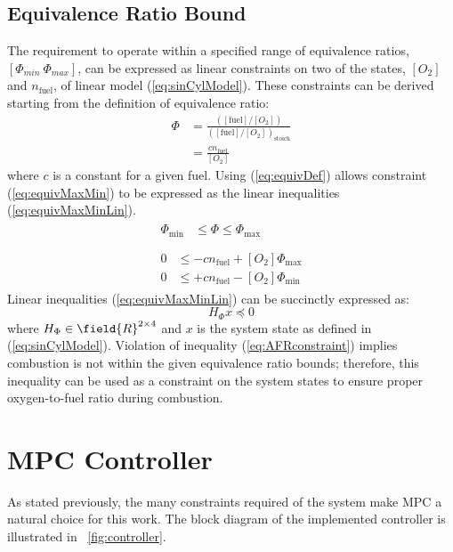 \subsection{Equivalence Ratio Bound}
\label{sec:stateConstraints}
The requirement to operate within a specified range of equivalence ratios, $[\Phi_{min}~\Phi_{max}]$, can be expressed as linear constraints on two of the states, $[O_2]$ and $n_{\mathrm{fuel}}$, of linear model (\ref{eq:sinCylModel}). These constraints can be derived starting from the definition of equivalence ratio:
\begin{equation}
\begin{aligned}
\Phi &= \frac{([\mathrm{fuel}]/[O_2])}{([\mathrm{fuel}]/[O_2])_{\mathrm{stoich}}}\\
&= \frac{cn_{\mathrm{fuel}}}{[O_2]} \label{eq:equivDef}
\end{aligned}
\end{equation}
where $c$ is a constant for a given fuel. Using (\ref{eq:equivDef}) allows constraint (\ref{eq:equivMaxMin}) to be expressed as the linear inequalities (\ref{eq:equivMaxMinLin}).
\begin{gather}
\begin{aligned}
\Phi_{\mathrm{min}} &\leq \Phi \leq \Phi_{\mathrm{max}} \label{eq:equivMaxMin}\\
\end{aligned}\\
\begin{aligned}
0 &\leq -cn_{\mathrm{fuel}} + [O_2] \Phi_{\mathrm{max}} \label{eq:equivMaxMinLin}\\
0 &\leq +cn_{\mathrm{fuel}} - [O_2] \Phi_{\mathrm{min}}
\end{aligned}
\end{gather}
Linear inequalities (\ref{eq:equivMaxMinLin}) can be succinctly expressed as:
\begin{equation}
H_{\Phi}x \preceq 0 \label{eq:AFRconstraint}
\end{equation}
where $H_{\Phi}\in\field{R}^{2\times4}$ and $x$ is the system state as defined in (\ref{eq:sinCylModel}). Violation of inequality (\ref{eq:AFRconstraint}) implies combustion is not within the given equivalence ratio bounds; therefore, this inequality can be used as a constraint on the system states to ensure proper oxygen-to-fuel ratio during combustion.

\section{MPC Controller} \label{sec:controller}
As stated previously, the many constraints required of the system make MPC a natural choice for this work. The block diagram of the implemented controller is illustrated in \figurename~\ref{fig:controller}.

